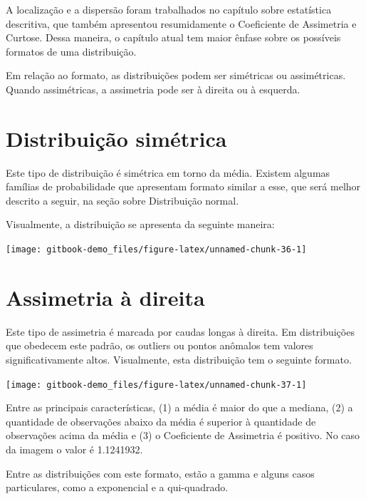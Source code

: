 \documentclass[
]{book}
\begin{document}
A localização e a dispersão foram trabalhados no capítulo sobre
estatística descritiva, que também apresentou resumidamente o
Coeficiente de Assimetria e Curtose. Dessa maneira, o capítulo atual tem
maior ênfase sobre os possíveis formatos de uma distribuição.

Em relação ao formato, as distribuições podem ser simétricas ou
assimétricas. Quando assimétricas, a assimetria pode ser à direita ou à
esquerda.

\hypertarget{distribuiuxe7uxe3o-simuxe9trica}{%
\section{Distribuição simétrica}\label{distribuiuxe7uxe3o-simuxe9trica}}

Este tipo de distribuição é simétrica em torno da média. Existem algumas
famílias de probabilidade que apresentam formato similar a esse, que
será melhor descrito a seguir, na seção sobre Distribuição normal.

Visualmente, a distribuição se apresenta da seguinte maneira:

\begin{center}\texttt{[image: gitbook-demo\_files/figure-latex/unnamed-chunk-36-1]} \end{center}

\hypertarget{assimetria-uxe0-direita}{%
\section{Assimetria à direita}\label{assimetria-uxe0-direita}}

Este tipo de assimetria é marcada por caudas longas à direita. Em
distribuições que obedecem este padrão, os outliers ou pontos anômalos
tem valores significativamente altos. Visualmente, esta distribuição tem
o seguinte formato.

\begin{center}\texttt{[image: gitbook-demo\_files/figure-latex/unnamed-chunk-37-1]} \end{center}

Entre as principais características, (1) a média é maior do que a
mediana, (2) a quantidade de observações abaixo da média é superior à
quantidade de observações acima da média e (3) o Coeficiente de
Assimetria é positivo. No caso da imagem o valor é 1.1241932.

Entre as distribuições com este formato, estão a gamma e alguns casos
particulares, como a exponencial e a qui-quadrado.
\end{document}
